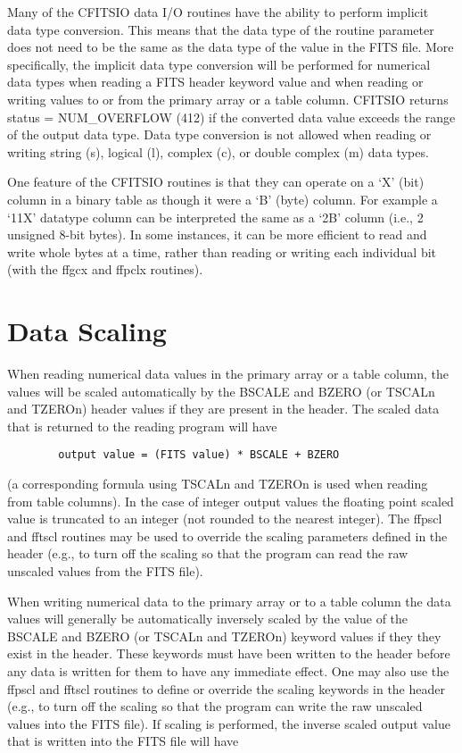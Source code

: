 Many of the CFITSIO data I/O routines have the ability to perform
implicit data type conversion.  This means that the data type of the
routine parameter does not need to be the same as the data type of the
value in the FITS file.  More specifically, the implicit data type
conversion will be performed for numerical data types when reading a
FITS header keyword value and when reading or writing values to or from
the primary array or a table column.  CFITSIO returns status =
NUM\_OVERFLOW (412) if the converted data value exceeds the range of
the output data type.  Data type conversion is not allowed when reading
or writing string (s), logical (l), complex (c), or double complex (m)
data types.

One feature of the CFITSIO routines is that they can operate on
a `X' (bit) column in a binary table as though it were a `B' (byte) column.
For example a `11X' datatype column can be interpreted the same
as a `2B' column (i.e., 2 unsigned 8-bit bytes).
In some instances, it can be more efficient to read and write whole
bytes at a time, rather than reading or writing each individual bit
(with the ffgcx and ffpclx routines).


\section{Data Scaling}

When reading numerical data values in the primary array or a
table column, the values will be scaled automatically by the BSCALE and
BZERO (or TSCALn and TZEROn) header values if they are
present in the header.  The scaled data that is returned to the reading
program will have

\begin{verbatim}
        output value = (FITS value) * BSCALE + BZERO
\end{verbatim}
(a corresponding formula using TSCALn and TZEROn is used when reading
from table columns).  In the case of integer output values the floating
point scaled value is truncated to an integer (not rounded to the
nearest integer).  The ffpscl and fftscl routines may be used to
override the scaling parameters defined in the header (e.g., to turn
off the scaling so that the program can read the raw unscaled values
from the FITS file).

When writing numerical data to the primary array or to a table
column the data values will generally be automatically inversely scaled
by the value of the BSCALE and BZERO (or TSCALn and TZEROn)
keyword values if they they exist in the header.  These keywords must
have been written to the header before any data is written for them to
have any immediate effect.  One may also use the ffpscl and fftscl
routines to define or override the scaling keywords in the header
(e.g., to turn off the scaling so that the program can write the raw
unscaled values into the FITS file). If scaling is performed, the
inverse scaled output value that is written into the FITS file will
have

